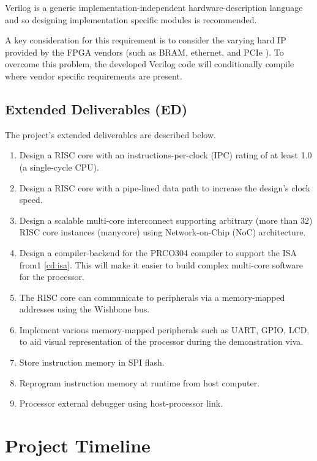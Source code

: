 \documentclass[11pt,a4paper]{report}
\begin{document}
{\begin{enumerate}[leftmargin=2\parindent, label=\bfseries CD\arabic*]
{Verilog is a generic implementation-independent hardware-description language and so designing implementation specific modules is recommended.

A key consideration for this requirement is to consider the varying hard IP provided by the FPGA vendors (such as BRAM, ethernet, and PCIe \cite{xilinxbram,alterabram}). To overcome this problem, the developed Verilog code will conditionally compile where vendor specific requirements are present.
}\label{cd:vendor}
\end{enumerate}

\subsection{Extended Deliverables (ED)}
The project's extended deliverables are described below.
\begin{enumerate}[leftmargin=2\parindent, label=\bfseries ED\arabic*]
    \item{Design a RISC core with an instructions-per-clock (IPC) rating of at least 1.0 (a single-cycle CPU).}
\label{ed:ipc}
    \item{Design a RISC core with a pipe-lined data path to increase the design's clock speed.}\label{ed:pipeline}
    \item{Design a scalable multi-core interconnect supporting arbitrary (more than 32) RISC core instances (manycore) using Network-on-Chip (NoC) architecture.}\label{ed:scale}
    \item{Design a compiler-backend for the PRCO304 \cite{prco304} compiler to support the ISA from1 \ref{cd:isa}. This will make it easier to build complex multi-core software for the processor.}\label{ed:compiler}
    \item{The RISC core can communicate to peripherals via a memory-mapped addresses using the Wishbone bus.}\label{ed:mmu}
    \item{Implement various memory-mapped peripherals such as UART, GPIO, LCD, to aid visual representation of the processor during the demonstration viva.}\label{ed:peripherals} 
    \item{Store instruction memory in SPI flash.}\label{ed:flash}
    \item{Reprogram instruction memory at runtime from host computer.}\label{ed:program}
    \item{Processor external debugger using host-processor link.}\label{ed:debug}
\end{enumerate}

\section{Project Timeline}
\label{sect:timeline}
}
\end{document}
